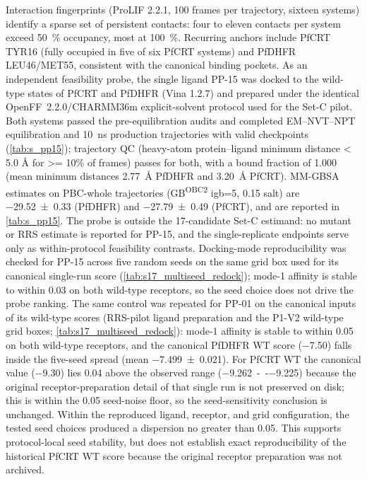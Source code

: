 \documentclass[journal=jcisd8,manuscript=suppinfo,layout=traditional]{achemso}
\begin{document}
Interaction fingerprints (ProLIF 2.2.1, \num{100} frames per trajectory, sixteen systems) identify a sparse set of persistent contacts: four to eleven contacts per system exceed \qty{50}{\percent} occupancy, most at \qty{100}{\percent}. Recurring anchors include PfCRT TYR16 (fully occupied in five of six PfCRT systems) and PfDHFR LEU46/MET55, consistent with the canonical binding pockets. As an independent feasibility probe, the single ligand PP-15 was docked to the wild-type states of PfCRT and PfDHFR (Vina 1.2.7) and prepared under the identical OpenFF~2.2.0/CHARMM36m explicit-solvent protocol used for the Set-C pilot. Both systems passed the pre-equilibration audits and completed EM--NVT--NPT equilibration and \qty{10}{ns} production trajectories with valid checkpoints (\cref{tab:s_pp15}); trajectory QC (heavy-atom protein--ligand minimum distance \num{< 5.0} \si{\angstrom} for \num{>= 10}\% of frames) passes for both, with a bound fraction of \num{1.000} (mean minimum distances \qty{2.77}{\angstrom} PfDHFR and \qty{3.20}{\angstrom} PfCRT). MM-GBSA estimates on PBC-whole trajectories (GB\textsuperscript{OBC2} igb=5, \qty{0.15}{\molar} salt) are \qty{-29.52 \pm 0.33}{\kcalmol} (PfDHFR) and \qty{-27.79 \pm 0.49}{\kcalmol} (PfCRT), and are reported in \cref{tab:s_pp15}. The probe is outside the 17-candidate Set-C estimand: no mutant or RRS estimate is reported for PP-15, and the single-replicate endpoints serve only as within-protocol feasibility contrasts. Docking-mode reproducibility was checked for PP-15 across five random seeds on the same grid box used for its canonical single-run score (\cref{tab:s17_multiseed_redock}); mode-1 affinity is stable to within \qty{0.03}{\kcalmol} on both wild-type receptors, so the seed choice does not drive the probe ranking. The same control was repeated for PP-01 on the canonical inputs of its wild-type scores (RRS-pilot ligand preparation and the P1-V2 wild-type grid boxes; \cref{tab:s17_multiseed_redock}): mode-1 affinity is stable to within \qty{0.05}{\kcalmol} on both wild-type receptors, and the canonical PfDHFR WT score (\qty{-7.50}{\kcalmol}) falls inside the five-seed spread (mean \qty{-7.499 \pm 0.021}{\kcalmol}). For PfCRT WT the canonical value (\qty{-9.30}{\kcalmol}) lies \qty{0.04}{\kcalmol} above the observed range (\qty{-9.262}{--}\qty{-9.225}{\kcalmol}) because the original receptor-preparation detail of that single run is not preserved on disk; this is within the \qty{0.05}{\kcalmol} seed-noise floor, so the seed-sensitivity conclusion is unchanged. Within the reproduced ligand, receptor, and grid configuration, the tested seed choices produced a dispersion no greater than \qty{0.05}{\kcalmol}. This supports protocol-local seed stability, but does not establish exact reproducibility of the historical PfCRT WT score because the original receptor preparation was not archived.
\end{document}
